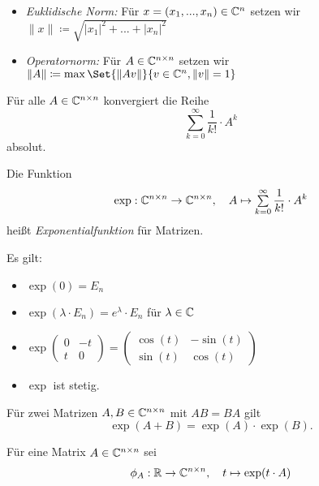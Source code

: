 \documentclass{cheat-sheet}
\begin{document}
\begin{definition}
\begin{itemize}
  \item \emph{Euklidische Norm:} Für $x = (x_1, ..., x_n) \in \mathbb{C}^n$ setzen wir $\| x \| \coloneqq \sqrt{|x_1|^2 + ... + |x_n|^2}$
  \item \emph{Operatornorm:} Für $A \in \mathbb{C}^{n \times n}$ setzen wir $\| A \| \coloneqq \max \Set{ \| Av \| }{ v \in \C^n, \| v \| = 1 }$
\end{itemize}
\end{definition}


\begin{satz}
Für alle $A \in \mathbb{C}^{n \times n}$ konvergiert die Reihe
\[ \sum_{k=0}^\infty \frac{1}{k!} \cdot A^k \]
absolut.
\end{satz}

\begin{definition}
Die Funktion
\[ \exp : \C^{n \times n} \to \C^{n \times n}, \quad A \mapsto \sum_{k=0}^{\infty} \frac{1}{k!} \cdot A^k \]
heißt \emph{Exponentialfunktion} für Matrizen.
\end{definition}

\begin{bem}
Es gilt:
\begin{itemize}
  \item $\exp(0) = E_n$
  \item $\exp(\lambda \cdot E_n) = e^\lambda \cdot E_n$ für $\lambda \in \mathbb{C}$
  \item $\exp \begin{pmatrix} 0 & -t \\ t & 0 \end{pmatrix} = \begin{pmatrix} \cos(t) & -\sin(t) \\ \sin(t) & \cos(t) \end{pmatrix}$
  \item $\exp$ ist stetig.
\end{itemize}
\end{bem}

\begin{satz}
Für zwei Matrizen $A, B \in \mathbb{C}^{n \times n}$ mit $AB = BA$ gilt
\[ \exp(A + B) = \exp(A) \cdot \exp(B). \]
\end{satz}

\begin{definition}
Für eine Matrix $A \in \mathbb{C}^{n \times n}$ sei
\[ \phi_A : \mathbb{R} \to \mathbb{C}^{n \times n},\quad t \mapsto \exp(t \cdot A) \]
\end{definition}
\end{document}
